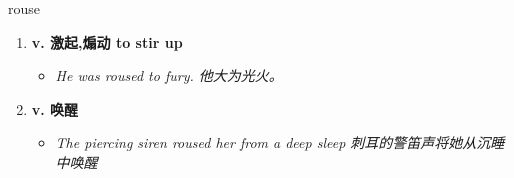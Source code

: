 
\begin{frame}
{\huge rouse}
\begin{center}
\begin{enumerate}\Large
  \item \textbf{v. 激起,煽动 to stir up}
  \begin{itemize}
    \item \em{\Large{He was roused to fury. 他大为光火。}}
  \end{itemize}
  \item \textbf{v. 唤醒}
  \begin{itemize}
    \item \em{\Large{The piercing siren roused her from a deep sleep 刺耳的警笛声将她从沉睡中唤醒}}
  \end{itemize}
\end{enumerate}
\end{center}
\end{frame}
